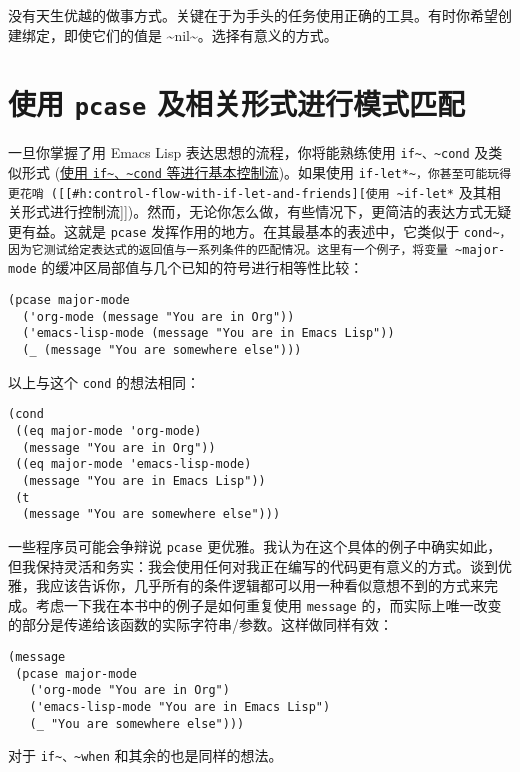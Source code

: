 \documentclass[11pt]{ctexart}
\begin{document}
没有天生优越的做事方式。关键在于为手头的任务使用正确的工具。有时你希望创建绑定，即使它们的值是 \textasciitilde{}nil\textasciitilde{}。选择有意义的方式。
\section{使用 \texttt{pcase} 及相关形式进行模式匹配}
\label{sec:org6c9b23a}
一旦你掌握了用 Emacs Lisp 表达思想的流程，你将能熟练使用 \texttt{if\textasciitilde{}、\textasciitilde{}cond} 及类似形式 (\hyperref[sec:org9ad3ad6]{使用 \texttt{if\textasciitilde{}、\textasciitilde{}cond} 等进行基本控制流})。如果使用 \texttt{if-let*\textasciitilde{}，你甚至可能玩得更花哨 ([[\#h:control-flow-with-if-let-and-friends][使用 \textasciitilde{}if-let*} 及其相关形式进行控制流]])。然而，无论你怎么做，有些情况下，更简洁的表达方式无疑更有益。这就是 \texttt{pcase} 发挥作用的地方。在其最基本的表述中，它类似于 \texttt{cond\textasciitilde{}，因为它测试给定表达式的返回值与一系列条件的匹配情况。这里有一个例子，将变量 \textasciitilde{}major-mode} 的缓冲区局部值与几个已知的符号进行相等性比较：

\begin{verbatim}
(pcase major-mode
  ('org-mode (message "You are in Org"))
  ('emacs-lisp-mode (message "You are in Emacs Lisp"))
  (_ (message "You are somewhere else")))
\end{verbatim}

以上与这个 \texttt{cond} 的想法相同：

\begin{verbatim}
(cond
 ((eq major-mode 'org-mode)
  (message "You are in Org"))
 ((eq major-mode 'emacs-lisp-mode)
  (message "You are in Emacs Lisp"))
 (t
  (message "You are somewhere else")))
\end{verbatim}

一些程序员可能会争辩说 \texttt{pcase} 更优雅。我认为在这个具体的例子中确实如此，但我保持灵活和务实：我会使用任何对我正在编写的代码更有意义的方式。谈到优雅，我应该告诉你，几乎所有的条件逻辑都可以用一种看似意想不到的方式来完成。考虑一下我在本书中的例子是如何重复使用 \texttt{message} 的，而实际上唯一改变的部分是传递给该函数的实际字符串/参数。这样做同样有效：

\begin{verbatim}
(message
 (pcase major-mode
   ('org-mode "You are in Org")
   ('emacs-lisp-mode "You are in Emacs Lisp")
   (_ "You are somewhere else")))
\end{verbatim}

对于 \texttt{if\textasciitilde{}、\textasciitilde{}when} 和其余的也是同样的想法。
\end{document}
